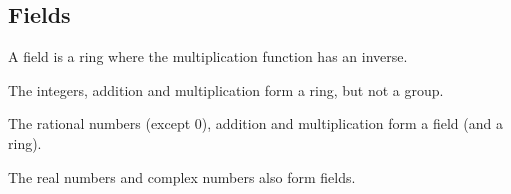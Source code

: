 
\subsection{Fields}

A field is a ring where the multiplication function has an inverse.

The integers, addition and multiplication form a ring, but not a group.

The rational numbers (except \(0\)), addition and multiplication form a field (and a ring).

The real numbers and complex numbers also form fields.

